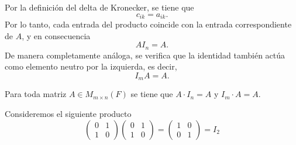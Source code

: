 \documentclass[12pt,a4paper]{book}
\begin{document}
    Por la definición del delta de Kronecker, se tiene que
    \begin{equation*}
        c_{ik}=a_{ik}.
    \end{equation*}
    Por lo tanto, cada entrada del producto coincide con la entrada correspondiente de $A$, y en consecuencia
    \begin{equation*}
        AI_{n}=A.
    \end{equation*}
    De manera completamente análoga, se verifica que la identidad también actúa como
    elemento neutro por la izquierda, es decir,
    \begin{equation*}
        I_{m}A=A.
    \end{equation*}

    \begin{proposicion}
    \label{prop:7}
        Para toda matriz $A\in M_{m\times n}(F)$ se tiene que $A\cdot I_{n}=A$ y
        $I_{m}\cdot A=A$.
    \end{proposicion}

    \begin{ejemplo}
    \label{ej:12}
        Consideremos el siguiente producto
        \begin{equation*}
            \begin{pmatrix}
                0 & 1\\
                1 & 0
            \end{pmatrix}
            \begin{pmatrix}
                0 & 1\\
                1 & 0
            \end{pmatrix}
            =
            \begin{pmatrix}
                1 & 0\\
                0 & 1
            \end{pmatrix}
            =I_{2}
        \end{equation*}
    \end{ejemplo}
\end{document}
